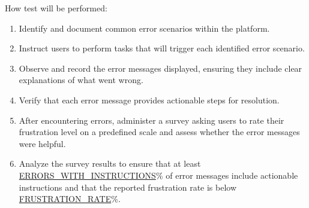 \documentclass[12pt, titlepage]{article}
\begin{document}
\begin{enumerate}
How test will be performed:
\begin{enumerate}
    \item Identify and document common error scenarios within the platform.
    \item Instruct users to perform tasks that will trigger each identified error scenario.
    \item Observe and record the error messages displayed, ensuring they include clear explanations of what went wrong.
    \item Verify that each error message provides actionable steps for resolution.
    \item After encountering errors, administer a survey asking users to rate their frustration level on a predefined scale and assess whether the error messages were helpful.
    \item Analyze the survey results to ensure that at least \hyperref[ERRORS_WITH_INSTRUCTIONS]{ERRORS\_WITH\_INSTRUCTIONS}\% of error messages include actionable instructions and that the reported frustration rate is below \hyperref[FRUSTRATION_RATE]{FRUSTRATION\_RATE}\%.
\end{enumerate}


\end{enumerate}

\end{document}
